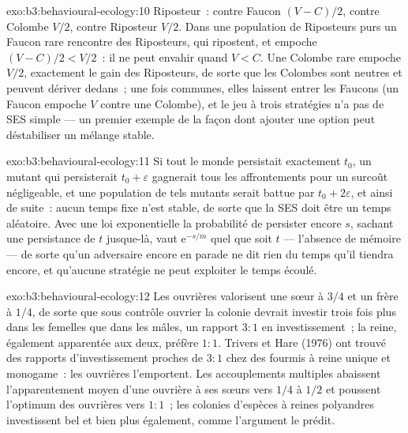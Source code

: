 \begin{solution}{exo:b3:behavioural-ecology:10}
Riposteur~: contre Faucon $(V - C)/2$, contre Colombe $V/2$, contre
Riposteur $V/2$. Dans une population de Riposteurs purs un Faucon rare
rencontre des Riposteurs, qui ripostent, et empoche $(V - C)/2 < V/2$~:
il ne peut envahir quand $V < C$. Une Colombe rare empoche $V/2$,
exactement le gain des Riposteurs, de sorte que les Colombes sont
neutres et peuvent dériver dedans~; une fois communes, elles laissent
entrer les Faucons (un Faucon empoche $V$ contre une Colombe), et le jeu
à trois stratégies n'a pas de SES simple --- un premier exemple de la
façon dont ajouter une option peut déstabiliser un mélange stable.
\end{solution}

\begin{solution}{exo:b3:behavioural-ecology:11}
Si tout le monde persistait exactement $t_{0}$, un mutant qui
persisterait $t_{0} +
\varepsilon$ gagnerait tous les affrontements pour un surcoût
négligeable, et une population de tels mutants serait battue par
$t_{0} + 2\varepsilon$, et ainsi de suite~: aucun temps fixe n'est
stable, de sorte que la SES doit être un temps aléatoire. Avec une loi
exponentielle la probabilité de persister encore $s$, sachant une
persistance de $t$ jusque-là, vaut $\mathrm{e}^{-s/m}$ quel que soit $t$
--- l'absence de mémoire --- de sorte qu'un adversaire encore en parade
ne dit rien du temps qu'il tiendra encore, et qu'aucune stratégie ne
peut exploiter le temps écoulé.
\end{solution}

\begin{solution}{exo:b3:behavioural-ecology:12}
Les ouvrières valorisent une sœur à $3/4$ et un frère à $1/4$, de sorte
que sous contrôle ouvrier la colonie devrait investir trois fois plus
dans les femelles que dans les mâles, un rapport $3{:}1$ en
investissement~; la reine, également apparentée aux deux, préfère
$1{:}1$. Trivers et Hare (1976) ont trouvé des rapports
d'investissement proches de $3{:}1$ chez des fourmis à reine unique et
monogame~: les ouvrières l'emportent. Les accouplements multiples
abaissent l'apparentement moyen d'une ouvrière à ses sœurs vers $1/4$ à
$1/2$ et poussent l'optimum des ouvrières vers $1{:}1$~; les colonies
d'espèces à reines polyandres investissent bel et bien plus également,
comme l'argument le prédit.
\end{solution}

